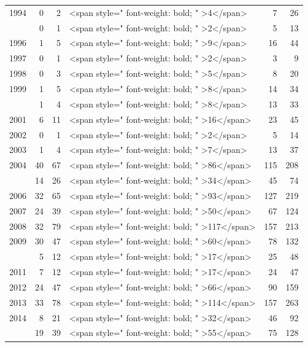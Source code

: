 \begin{table}[!h]
\begin{tabular}[t]{lrrlrr}
1994 & 0 & 2 & <span style=" font-weight: bold;    " >4</span> & 7 & 26\\
\addlinespace
1995 & 0 & 1 & <span style=" font-weight: bold;    " >2</span> & 5 & 13\\
1996 & 1 & 5 & <span style=" font-weight: bold;    " >9</span> & 16 & 44\\
1997 & 0 & 1 & <span style=" font-weight: bold;    " >2</span> & 3 & 9\\
1998 & 0 & 3 & <span style=" font-weight: bold;    " >5</span> & 8 & 20\\
1999 & 1 & 5 & <span style=" font-weight: bold;    " >8</span> & 14 & 34\\
\addlinespace
2000 & 1 & 4 & <span style=" font-weight: bold;    " >8</span> & 13 & 33\\
2001 & 6 & 11 & <span style=" font-weight: bold;    " >16</span> & 23 & 45\\
2002 & 0 & 1 & <span style=" font-weight: bold;    " >2</span> & 5 & 14\\
2003 & 1 & 4 & <span style=" font-weight: bold;    " >7</span> & 13 & 37\\
2004 & 40 & 67 & <span style=" font-weight: bold;    " >86</span> & 115 & 208\\
\addlinespace
2005 & 14 & 26 & <span style=" font-weight: bold;    " >34</span> & 45 & 74\\
2006 & 32 & 65 & <span style=" font-weight: bold;    " >93</span> & 127 & 219\\
2007 & 24 & 39 & <span style=" font-weight: bold;    " >50</span> & 67 & 124\\
2008 & 32 & 79 & <span style=" font-weight: bold;    " >117</span> & 157 & 213\\
2009 & 30 & 47 & <span style=" font-weight: bold;    " >60</span> & 78 & 132\\
\addlinespace
2010 & 5 & 12 & <span style=" font-weight: bold;    " >17</span> & 25 & 48\\
2011 & 7 & 12 & <span style=" font-weight: bold;    " >17</span> & 24 & 47\\
2012 & 24 & 47 & <span style=" font-weight: bold;    " >66</span> & 90 & 159\\
2013 & 33 & 78 & <span style=" font-weight: bold;    " >114</span> & 157 & 263\\
2014 & 8 & 21 & <span style=" font-weight: bold;    " >32</span> & 46 & 92\\
\addlinespace
2015 & 19 & 39 & <span style=" font-weight: bold;    " >55</span> & 75 & 128\\

\end{tabular}
\end{table}
